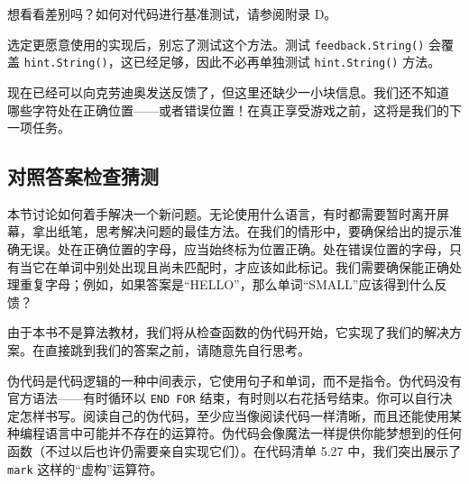 想看看差别吗？如何对代码进行基准测试，请参阅附录 D。

选定更愿意使用的实现后，别忘了测试这个方法。测试 \texttt{feedback.String()} 会覆盖 \texttt{hint.String()}，这已经足够，因此不必再单独测试 \texttt{hint.String()} 方法。

现在已经可以向克劳迪奥发送反馈了，但这里还缺少一小块信息。我们还不知道
哪些字符处在正确位置——或者错误位置！在真正享受游戏之前，这将是我们的下一项任务。

\subsection{对照答案检查猜测}

本节讨论如何着手解决一个新问题。无论使用什么语言，有时都需要暂时离开屏幕，拿出纸笔，思考解决问题的最佳方法。在我们的情形中，要确保给出的提示准确无误。处在正确位置的字母，应当始终标为位置正确。处在错误位置的字母，只有当它在单词中别处出现且尚未匹配时，才应该如此标记。我们需要确保能正确处理重复字母；例如，如果答案是“HELLO”，那么单词“SMALL”应该得到什么反馈？

由于本书不是算法教材，我们将从检查函数的伪代码开始，它实现了我们的解决方案。在直接跳到我们的答案之前，请随意先自行思考。

伪代码是代码逻辑的一种中间表示，它使用句子和单词，而不是指令。伪代码没有官方语法——有时循环以 \texttt{END FOR} 结束，有时则以右花括号结束。你可以自行决定怎样书写。阅读自己的伪代码，至少应当像阅读代码一样清晰，而且还能使用某种编程语言中可能并不存在的运算符。伪代码会像魔法一样提供你能梦想到的任何函数（不过以后也许仍需要亲自实现它们）。在代码清单 5.27 中，我们突出展示了 \texttt{mark} 这样的“虚构”运算符。
